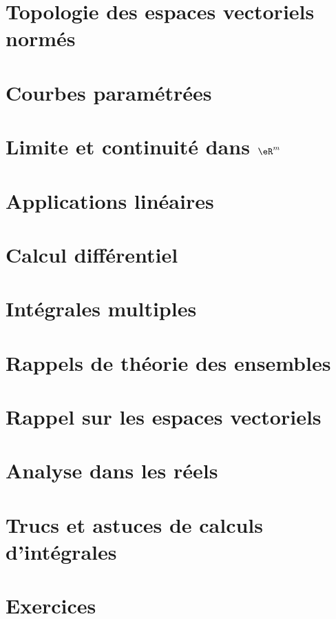 
\chapter{Topologie des espaces vectoriels normés}      \label{ChapEspVectNorm}


\chapter{Courbes paramétrées}           \label{Chap_courbes}


\chapter{Limite et continuité dans $\eR^m$} \label{ChapLimContinuite}


\chapter{Applications linéaires}        \label{Chap_appl_lin}


\chapter{Calcul différentiel}           \label{ChapCalculDiff}


\chapter{Intégrales multiples}          \label{ChapMultiples}


\chapter{Rappels de théorie des ensembles}


\chapter{Rappel sur les espaces vectoriels}    \label{AppendiceEspVectoriels}


\chapter{Analyse dans les réels}        \label{AppendiceAnalyseR}


\chapter{Trucs et astuces de calculs d'intégrales}


\chapter{Exercices}             \label{Chap_exercices}


\makeatletter
{}\oldpath
\makeatother


